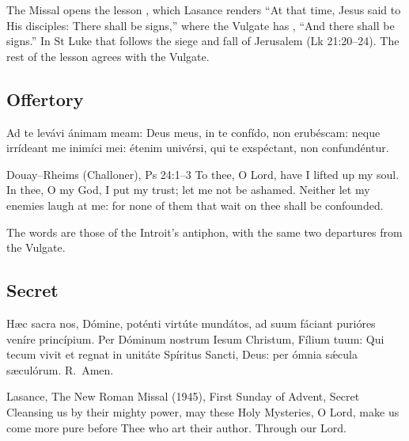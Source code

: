 \noindent The Missal opens the lesson , which Lasance renders ``At that time, Jesus
said to His disciples: There shall be signs,'' where the Vulgate has , ``And there shall be signs.'' In St Luke that  follows
the siege and fall of Jerusalem (Lk 21:20--24). The rest of the lesson agrees
with the Vulgate.

\subsection{Offertory}
\label{proper-offertory}


\begin{latinproper}
Ad te levávi ánimam meam: Deus meus, in te confído, non erubéscam: neque
irrídeant me inimíci mei: étenim univérsi, qui te exspéctant, non
confundéntur.
\end{latinproper}

\begin{englishwitness}{Douay--Rheims (Challoner), Ps 24:1--3}
To thee, O Lord, have I lifted up my soul. In thee, O my God, I put my trust;
let me not be ashamed. Neither let my enemies laugh at me: for none of them
that wait on thee shall be confounded.
\end{englishwitness}

\noindent The words are those of the Introit's antiphon, with the same two
departures from the Vulgate.

\subsection{Secret}
\label{proper-secret}


\begin{latinproper}
Hæc sacra nos, Dómine, poténti virtúte mundátos, ad suum fáciant purióres
veníre princípium. Per Dóminum nostrum Iesum Christum, Fílium tuum: Qui tecum
vivit et regnat in unitáte Spíritus Sancti, Deus: per ómnia sǽcula
sæculórum. R.~Amen.
\end{latinproper}

\begin{englishwitness}{Lasance, The New Roman Missal (1945), First Sunday of Advent, Secret}
Cleansing us by their mighty power, may these Holy Mysteries, O Lord, make
us come more pure before Thee who art their author. Through our Lord.
\end{englishwitness}

